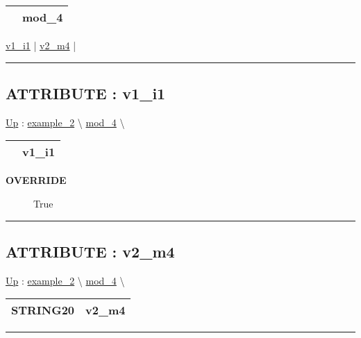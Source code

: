 {\renewcommand{\arraystretch}{1.5}
\begin{tabularx}{\textwidth}{|>{\raggedright\arraybackslash}l|X|}
\hline
\hspace{0pt} & mod\_4 \\
\hline
\end{tabularx}
}

\par


\hyperlink{ecldoc:example_2.mod_4.v1_i1}{v1\_i1}  |
\hyperlink{ecldoc:example_2.mod_4.v2_m4}{v2\_m4}  |

\rule{\linewidth}{0.5pt}

\subsection*{ATTRIBUTE : v1\_i1}
\hypertarget{ecldoc:example_2.mod_4.v1_i1}{}
\hyperlink{ecldoc:example_2.mod_4}{Up} :
\hspace{0pt} \hyperlink{ecldoc:example_2}{example_2} \textbackslash 
\hspace{0pt} \hyperlink{ecldoc:example_2.mod_4}{mod_4} \textbackslash 

{\renewcommand{\arraystretch}{1.5}
\begin{tabularx}{\textwidth}{|>{\raggedright\arraybackslash}l|X|}
\hline
\hspace{0pt} & v1\_i1 \\
\hline
\end{tabularx}
}

\par

\par
\begin{description}
\item [\textbf{OVERRIDE}] True
\end{description}

\rule{\linewidth}{0.5pt}
\subsection*{ATTRIBUTE : v2\_m4}
\hypertarget{ecldoc:example_2.mod_4.v2_m4}{}
\hyperlink{ecldoc:example_2.mod_4}{Up} :
\hspace{0pt} \hyperlink{ecldoc:example_2}{example_2} \textbackslash 
\hspace{0pt} \hyperlink{ecldoc:example_2.mod_4}{mod_4} \textbackslash 

{\renewcommand{\arraystretch}{1.5}
\begin{tabularx}{\textwidth}{|>{\raggedright\arraybackslash}l|X|}
\hline
\hspace{0pt}STRING20 & v2\_m4 \\
\hline
\end{tabularx}
}

\par


\rule{\linewidth}{0.5pt}




